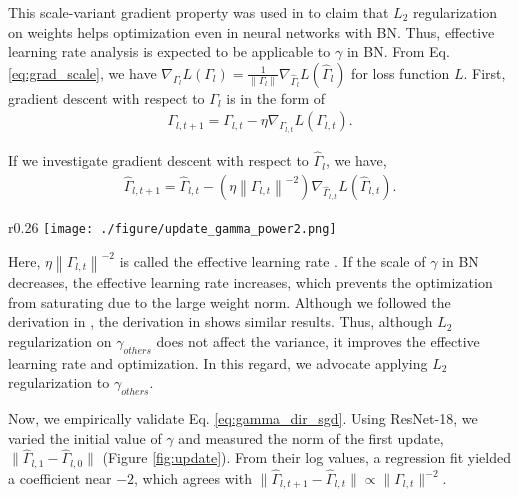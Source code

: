 \documentclass{article}
\begin{document}
This scale-variant gradient property was used in \cite{gcorr/Laarhoven17b,gnips/HofferBGS18} to claim that $L_2$ regularization on weights helps optimization even in neural networks with BN. Thus, effective learning rate analysis is expected to be applicable to $\gamma$ in BN. From Eq. \ref{eq:grad_scale}, we have $\nabla_{\Gamma_l} L(\Gamma_l) = \frac{1}{\left\lVert \Gamma_l \right\rVert} \nabla_{\hat{\Gamma}_l} L(\hat{\Gamma}_l)$ for loss function $L$. First, gradient descent with respect to $\Gamma_l$ is in the form of
\begin{align}
	\Gamma_{l,t+1} = \Gamma_{l,t} - \eta \nabla_{\Gamma_{l,t}} L(\Gamma_{l,t}).
\end{align}

If we investigate gradient descent with respect to $\hat{\Gamma}_l$, we have,
\begin{align}
    \hat{\Gamma}_{l,t+1} = \hat{\Gamma}_{l,t} - \left(\eta \left\lVert \Gamma_{l,t} \right\rVert^{-2} \right) \nabla_{\hat{\Gamma}_{l,t}} L(\hat{\Gamma}_{l,t}). \label{eq:gamma_dir_sgd}
\end{align}

\begin{wrapfigure}{r}{0.26\textwidth}
	\centering
\texttt{[image: ./figure/update\_gamma\_power2.png]}
    \caption{Norm of the first update by the initial value of $\gamma$.}
    \label{fig:update}
\end{wrapfigure}

Here, $\eta \left\lVert \Gamma_{l,t} \right\rVert^{-2}$ is called the effective learning rate \cite{gcorr/Laarhoven17b,gnips/HofferBGS18}. If the scale of $\gamma$ in BN decreases, the effective learning rate increases, which prevents the optimization from saturating due to the large weight norm. Although we followed the derivation in \cite{gcorr/Laarhoven17b}, the derivation in \cite{gnips/HofferBGS18} shows similar results. Thus, although $L_2$ regularization on $\gamma_{others}$ does not affect the variance, it improves the effective learning rate and optimization. In this regard, we advocate applying $L_2$ regularization to $\gamma_{others}$.

Now, we empirically validate Eq. \ref{eq:gamma_dir_sgd}. Using ResNet-18, we varied the initial value of $\gamma$ and measured the norm of the first update, $\lVert \hat{\Gamma}_{l,1} -\hat{\Gamma}_{l,0} \rVert$ (Figure \ref{fig:update}). From their log values, a regression fit yielded a coefficient near $-2$, which agrees with $\lVert \hat{\Gamma}_{l,t+1} -\hat{\Gamma}_{l,t} \rVert \propto \lVert \Gamma_{l,t} \rVert^{-2}$.
\end{document}
